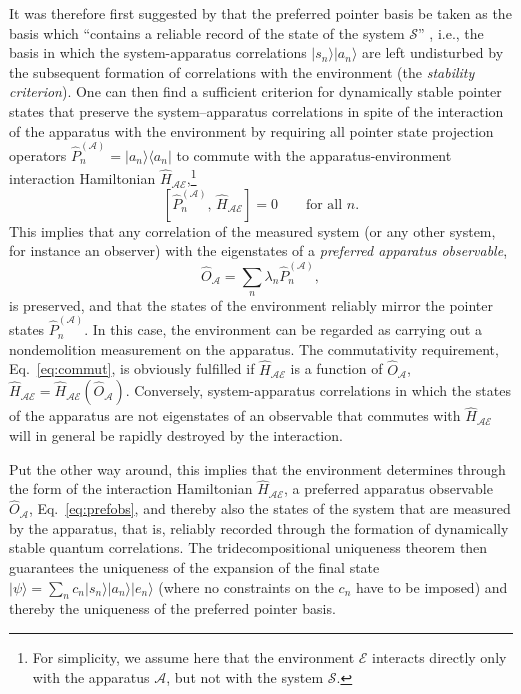 \documentclass[rmp,aps,amsmath,amsfonts,noshowkeys,noshowpacs,12pt]{revtex4}
\newcommand{\ket}[1]{\ensuremath{|{#1\rangle}}}
\newcommand{\bra}[1]{\ensuremath{{\langle #1}|}}
\begin{document}
It was therefore first suggested by \citet{Zurek:1981:dd} that the
preferred pointer basis be taken as the basis which ``contains a
reliable record of the state of the system $\mathcal{S}$''
\citep[p.~1519]{Zurek:1981:dd}, i.e., the basis in which the
system-apparatus correlations $\ket{s_n}\ket{a_n}$ are left
undisturbed by the subsequent formation of correlations with the
environment (the {\em stability criterion}). One can then find a
sufficient criterion for dynamically stable pointer states that
preserve the system--apparatus correlations in spite of the
interaction of the apparatus with the environment by requiring all
pointer state projection operators $\widehat{P}^{(\mathcal{A})}_n =
\ket{a_n} \bra{a_n}$ to commute with the apparatus-environment
interaction Hamiltonian $\widehat{H}_\mathcal{AE}$,\footnote{For
  simplicity, we assume here that the environment $\mathcal{E}$
  interacts directly only with the apparatus $\mathcal{A}$, but not
  with the system $\mathcal{S}$.}
%
\begin{equation} \label{eq:commut}
[\widehat{P}^{(\mathcal{A})}_n, \,
\widehat{H}_\mathcal{AE}] = 0 \qquad \text{for all $n$.}
\end{equation}
%
This implies that any correlation of the measured system (or any
other system, for instance an observer) with the eigenstates of a
\emph{preferred apparatus observable},
%
\begin{equation} \label{eq:prefobs} \widehat{O}_\mathcal{A} = \sum_n \lambda_n
\widehat{P}^{(\mathcal{A})}_n, \end{equation}
%
is preserved, and that the states of the environment reliably mirror
the pointer states $\widehat{P}^{(\mathcal{A})}_n$. In this case, the
environment can be regarded as carrying out a nondemolition
measurement on the apparatus. The commutativity requirement,
Eq.~\eqref{eq:commut}, is obviously fulfilled if
$\widehat{H}_\mathcal{AE}$ is a function of $\widehat{O}_\mathcal{A}$,
$\widehat{H}_\mathcal{AE}=\widehat{H}_\mathcal{AE}(\widehat{O}_\mathcal{A})$.
Conversely, system-apparatus correlations in which the states of the
apparatus are not eigenstates of an observable that commutes with
$\widehat{H}_\mathcal{AE}$ will in general be rapidly destroyed by the
interaction.

Put the other way around, this implies that the environment determines
through the form of the interaction Hamiltonian
$\widehat{H}_\mathcal{AE}$, a preferred apparatus observable
$\widehat{O}_\mathcal{A}$, Eq.~\eqref{eq:prefobs}, and thereby also
the states of the system that are measured by the apparatus, that is,
reliably recorded through the formation of dynamically stable quantum
correlations. The tridecompositional uniqueness theorem then
guarantees the uniqueness of the expansion of the final state
$\ket{\psi} = \sum_n c_n \ket{s_n} \ket{a_n} \ket{e_n}$ (where no
constraints on the $c_n$ have to be imposed) and thereby the
uniqueness of the preferred pointer basis.
\end{document}
